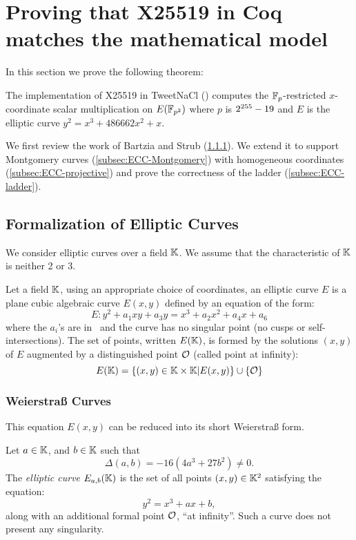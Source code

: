 \section{Proving that X25519 in Coq matches the mathematical model}
\label{sec:maths}

In this section we prove the following theorem:
\begin{theorem}
\label{thm:Elliptic-CSM}
The implementation of X25519 in TweetNaCl () computes the
$\mathbb{F}_{p}$-restricted $x$-coordinate scalar multiplication on $E(\mathbb{F}_{p^2})$ where $p$ is $2^{255}-19$
and $E$ is the elliptic curve $y^2 = x^3 + 486662 x^2 + x$.
\end{theorem}

We first review the work of Bartzia and Strub \cite{BartziaS14} (\ref{subsec:ECC-Weierstrass}).
We extend it to support Montgomery curves (\ref{subsec:ECC-Montgomery})
with homogeneous coordinates (\ref{subsec:ECC-projective}) and prove the
correctness of the ladder (\ref{subsec:ECC-ladder}).

\subsection{Formalization of Elliptic Curves}
\label{subsec:ECC}

We consider elliptic curves over a field $\mathbb{K}$. We assume that the
characteristic of $\mathbb{K}$ is neither 2 or 3.

\begin{dfn}
Let a field $\mathbb{K}$, using an appropriate choice of coordinates, an elliptic curve $E$
is a plane cubic algebraic curve $E(x,y)$ defined by an equation of the form:
$$E : y^2 + a_1 xy + a_3 y = x^3 + a_2 x^2 + a_4 x + a_6$$
where the $a_i$'s are in \K\ and the curve has no singular point (\ie no cusps
or self-intersections). The set of points, written $E(\mathbb{K})$, is formed by the
solutions $(x,y)$ of $E$ augmented by a distinguished point $\mathcal{O}$ (called point at infinity):
$$E(\mathbb{K}) = \{(x,y) \in \mathbb{K} \times \mathbb{K} | E(x,y)\} \cup \{\mathcal{O}\}$$
\end{dfn}

\subsubsection{Weierstra{\ss} Curves}
\label{subsec:ECC-Weierstrass}

This equation $E(x,y)$ can be reduced into its short Weierstra{\ss} form.

\begin{dfn}
Let $a \in \mathbb{K}$, and $b \in \mathbb{K}$ such that $$\Delta(a,b) = -16(4a^3 + 27b^2) \neq 0.$$
The \textit{elliptic curve} $E_{a,b}(\mathbb{K})$ is the set of all points $(x,y) \in \mathbb{K}^2$ satisfying the equation:
$$y^2 = x^3 + ax + b,$$
along with an additional formal point $\mathcal{O}$, ``at infinity''. Such a curve does not present any singularity.
\end{dfn}

